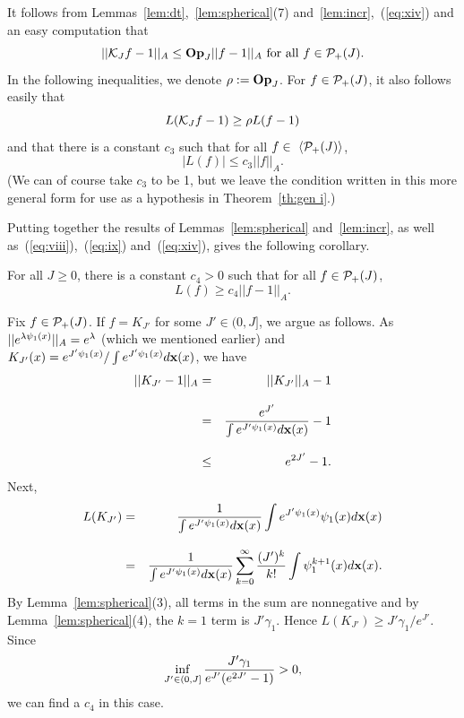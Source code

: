 It follows from Lemmas~\ref{lem:dt},~\ref{lem:spherical}(7) 
and~\ref{lem:incr},~(\ref{eq:xiv}) and an easy computation  that
\begin{equation} \label{eq:ixix}
||{\cal K}_J f-1||_A\le {\bf Op}_J ||f-1||_A \mbox{  for all  } f\in{\cal P}_+(J).
\end{equation}
In the following inequalities, we denote 
$\rho := {\bf Op}_J$.  For $f \in {\cal P}_+(J)$, it also follows easily that
\begin{equation} \label{eq:(a)}
L ({\cal K}_J f - 1 ) \geq \rho L (f - 1)
\end{equation}
and that there is a constant $c_3$ such that for all $f\in\,\,\langle{\cal P}_+(J)\rangle$,
\begin{equation} \label{eq:(c)}
|L(f)| \leq c_3 ||f||_A .
\end{equation}
(We can of course take $c_3$ to be 1, but we leave the condition written 
in this more general form for use as a hypothesis in Theorem~\ref{th:gen i}.)

Putting together the results of Lemmas~\ref{lem:spherical} and~\ref{lem:incr},
as well as~(\ref{eq:viii}),~(\ref{eq:ix}) and~(\ref{eq:xiv}),
gives the following corollary.

\begin{cor} \label{cor:(b)}
For all $J\ge 0$, 
there is a constant $c_4 > 0$ such that for all $f \in {\cal P}_+(J)$,
\begin{equation} \label{eq:(b)}
L (f) \geq c_4 ||f - 1||_A .
\end{equation}
\end{cor}

  Fix $f \in {\cal P}_+(J)$.  If $f = K_{J'}$ for
some $J' \in (0, J]$, we argue as follows. As 
$||e^{\lambda \psi_1(x)}||_A =e^{\lambda}$ (which we mentioned earlier)
and $K_{J'}(x)=e^{J'\psi_1(x)}/\int e^{J'\psi_1(x)}d{\bf x}(x)$, we have
\begin{eqnarray*}
||K_{J'} - 1||_A  & = & ||K_{J'} ||_A -1 
\\[2ex]
& = & {e^{J'}\over \int e^{J'\psi_1(x)}d{\bf x}(x)} -1
\\[2ex]
& \le & e^{2J'} -1.
\end{eqnarray*}
Next, 
\begin{eqnarray*}
L (K_{J'}) & = & {1\over \int e^{J'\psi_1(x)}d{\bf x}(x)} 
\int e^{J'\psi_1(x)}\psi_1(x)d{\bf x}(x) \\[2ex]
& = & {1\over \int e^{J'\psi_1(x)}d{\bf x}(x)} 
\sum_{k=0}^\infty {(J')^k\over k!} \int \psi_1^{k+1}(x)d{\bf x}(x).
\end{eqnarray*}
By Lemma~\ref{lem:spherical}(3), all terms in the sum are nonnegative and
by Lemma~\ref{lem:spherical}(4), the $k=1$ term is $J'\gamma_1$.
Hence $L (K_{J'})\ge J'\gamma_1/e^{J'}$. 
Since
$$
\inf_{J'\in (0,J]} {J'\gamma_1 \over  e^{J'}(e^{2J'} -1)  } >0,
$$
we can find a $c_4$ in this case.

